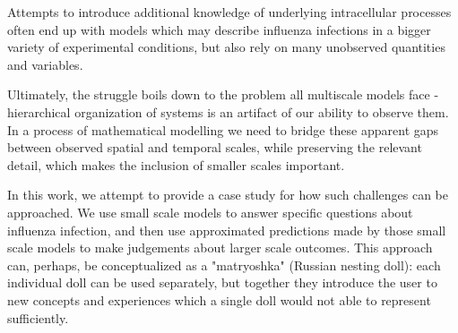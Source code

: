 Attempts to introduce additional knowledge of underlying intracellular processes \cite{heldt2013multiscale, rudiger2019multiscale} often end up with models which may describe influenza infections in a bigger variety of experimental conditions, but also rely on many unobserved quantities and variables.

Ultimately, the struggle boils down to the problem all multiscale models face \cite{qu2011multi} - hierarchical organization of systems is an artifact of our ability to observe them. In a process of mathematical modelling we need to bridge these apparent gaps between observed spatial and temporal scales, while preserving the relevant detail, which makes the inclusion of smaller scales important.

In this work, we attempt to provide a case study for how such challenges can be approached. We use small scale models to answer specific questions about influenza infection, and then use approximated predictions made by those small scale models to make judgements about larger scale outcomes. This approach can, perhaps, be conceptualized as a "matryoshka" (Russian nesting doll): each individual doll can be used separately, but together they introduce the user to new concepts and experiences which a single doll would not able to represent sufficiently.



















%